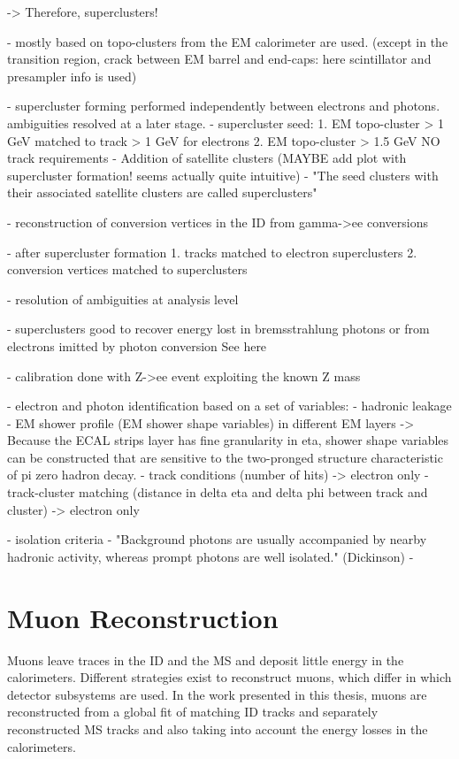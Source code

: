 -> Therefore, superclusters!

- mostly based on topo-clusters from the EM calorimeter are used. (except in the transition region, crack between EM barrel and end-caps: here scintillator and presampler info is used)

- supercluster forming performed independently between electrons and photons. ambiguities resolved at a later stage.
- supercluster seed:
    1. EM topo-cluster > 1 GeV matched to track > 1 GeV for electrons
    2. EM topo-cluster > 1.5 GeV NO track requirements
- Addition of satellite clusters (MAYBE add plot with supercluster formation! seems actually quite intuitive)
- "The seed clusters with their associated satellite clusters are called superclusters"

- reconstruction of conversion vertices in the ID from gamma->ee conversions

- after supercluster formation 
    1. tracks matched to electron superclusters
    2. conversion vertices matched to superclusters

- resolution of ambiguities at analysis level

- superclusters good to recover energy lost in bremsstrahlung photons or from electrons imitted by photon conversion
See here 

- calibration done with Z->ee event exploiting the known Z mass

- electron and photon identification based on a set of variables:
    - hadronic leakage
    - EM shower profile (EM shower shape variables) in different EM layers
        -> Because the ECAL strips layer has fine granularity in eta, shower shape variables can be constructed that are sensitive to the two-pronged structure characteristic of pi zero hadron decay.
    - track conditions (number of hits) -> electron only
    - track-cluster matching (distance in delta eta and delta phi between track and cluster) -> electron only 

- isolation criteria
   - "Background photons are usually accompanied by nearby hadronic activity, whereas prompt photons are well isolated." (Dickinson)
    - 



\section{Muon Reconstruction}
Muons leave traces in the ID and the MS and deposit little energy in the calorimeters. 
Different strategies exist to reconstruct muons, which differ in which detector subsystems are used.
In the work presented in this thesis, muons are reconstructed from a global fit of matching ID tracks and separately reconstructed MS tracks and also taking into account the energy losses in the calorimeters. 

